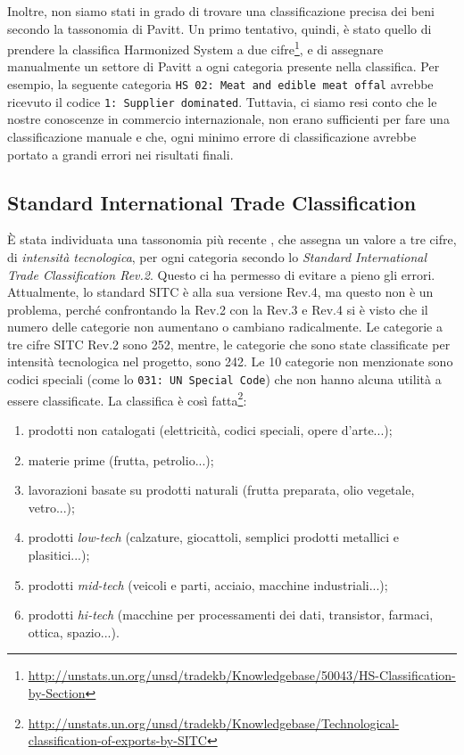 \documentclass[]{article}
\begin{document}
\begin{multicols}{2}
	Inoltre, non siamo stati in grado di trovare una classificazione precisa dei beni secondo la tassonomia di Pavitt. Un primo tentativo, quindi, è stato quello di prendere la classifica Harmonized System a due cifre\footnote{\url{http://unstats.un.org/unsd/tradekb/Knowledgebase/50043/HS-Classification-by-Section}}, e di assegnare manualmente un settore di Pavitt a ogni categoria presente nella classifica. Per esempio, la seguente categoria \texttt{HS 02: Meat and edible meat offal} avrebbe ricevuto il codice \texttt{1: Supplier dominated}. Tuttavia, ci siamo resi conto che le nostre conoscenze in commercio internazionale, non erano sufficienti per fare una classificazione manuale e che, ogni minimo errore di classificazione avrebbe portato a grandi errori nei risultati finali.
	
	\subsection{Standard International Trade Classification}
	È stata individuata una tassonomia più recente \cite{lall}, che assegna un valore a tre cifre, di \textit{intensità tecnologica}, per ogni categoria secondo lo \textit{Standard International Trade Classification Rev.2}. Questo ci ha permesso di evitare a pieno gli errori. Attualmente, lo standard SITC è alla sua versione Rev.4, ma questo non è un problema, perché confrontando la Rev.2 con la Rev.3 e Rev.4 si è visto che il numero delle categorie non aumentano o cambiano radicalmente. Le categorie a tre cifre SITC Rev.2 sono 252, mentre, le categorie che sono state classificate per intensità tecnologica nel progetto, sono 242. Le 10 categorie non menzionate sono codici speciali (come lo \texttt{031: UN Special Code}) che non hanno alcuna utilità a essere classificate. La classifica è così fatta\footnote{\url{http://unstats.un.org/unsd/tradekb/Knowledgebase/Technological-classification-of-exports-by-SITC}}:
	\begin{enumerate}
		\item prodotti non catalogati (elettricità, codici speciali, opere d'arte...);
		\item materie prime (frutta, petrolio...);
		\item lavorazioni basate su prodotti naturali (frutta preparata, olio vegetale, vetro...);
		\item prodotti \textit{low-tech} (calzature, giocattoli, semplici prodotti metallici e plasitici...);
		\item prodotti \textit{mid-tech} (veicoli e parti, acciaio, macchine industriali...);
		\item prodotti \textit{hi-tech} (macchine per processamenti dei dati, transistor, farmaci, ottica, spazio...).
	\end{enumerate}
	

\end{multicols}
\end{document}
